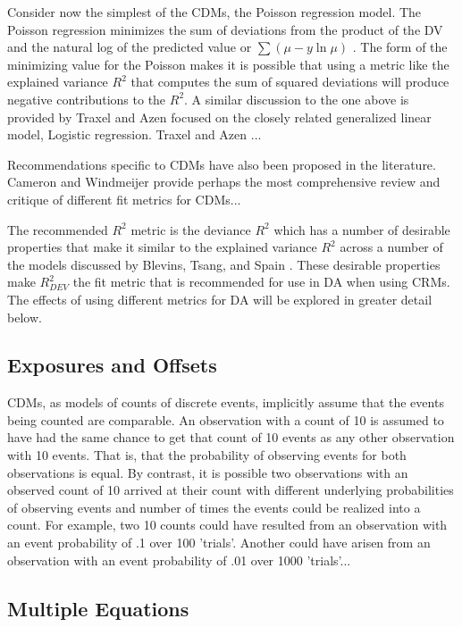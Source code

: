\documentclass[ShortAfour,times,sageapa]{sagej}
\begin{document}
	Consider now the simplest of the CDMs, the Poisson regression model. The Poisson regression minimizes the sum of deviations from the product of the DV and the natural log of the predicted value or $\sum (\mu - y \ln \mu)$ \cite{cameron1996r}. The form of the minimizing value for the Poisson makes it is possible that using a metric like the explained variance $R^2$ that computes the sum of squared deviations will produce negative contributions to the $R^2$.
	A similar discussion to the one above is provided by Traxel and Azen \cite{azen2009using} focused on the closely related generalized linear model, Logistic regression.  Traxel and Azen ...
	
	Recommendations specific to CDMs have also been proposed in the literature.  Cameron and Windmeijer \cite{cameron1996r} provide perhaps the most comprehensive review and critique of different fit metrics for CDMs... 
	
	The recommended $R^2$ metric is the deviance $R^2$ which has a number of desirable properties that make it similar to the explained variance $R^2$ across a number of the models discussed by Blevins, Tsang, and Spain \cite{blevins2015count}.  These desirable properties make $R^{2}_{DEV}$ the fit metric that is recommended for use in DA when using CRMs.  The effects of using different metrics for DA will be explored in greater detail below.
	
	\subsection{Exposures and Offsets}
	
	CDMs, as models of counts of discrete events, implicitly assume that the events being counted are comparable.  
	An observation with a count of 10 is assumed to have had the same chance to get that count of 10 events as any other observation with 10 events.  
	That is, that the probability of observing events for both observations is equal.
	By contrast, it is possible two observations with an observed count of 10 arrived at their count with different underlying probabilities of observing events and number of times the events could be realized into a count.  
	For example, two 10 counts could have resulted from an observation with an event probability of .1 over 100 'trials'.  Another could have arisen from an observation with an event probability of .01 over 1000 'trials'...
	
	\subsection{Multiple Equations}
	
\end{document}
